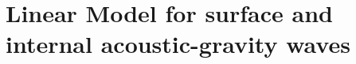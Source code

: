 \documentclass[a4paper,11pt]{article}
\begin{document}


\section{Linear Model for surface and internal acoustic-gravity waves}
\label{SectionLinModels}
\end{document}
